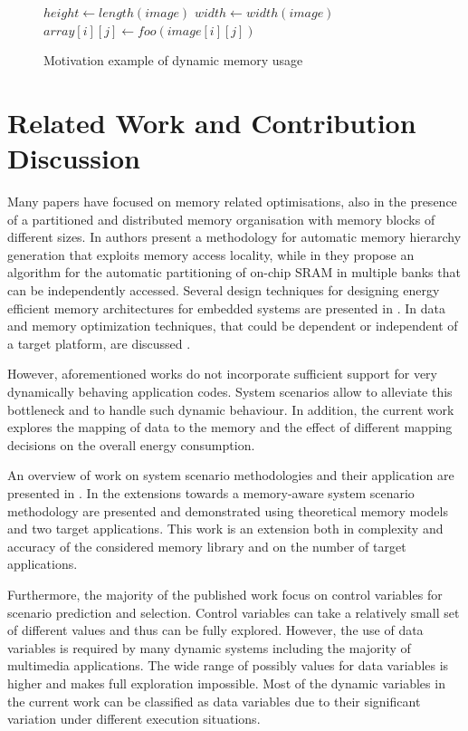 \documentclass[a4paper,conference]{IEEEtran}
\begin{document}
\begin{figure}[!t]
\begin{algorithmic}
	\STATE $height \gets length(image)$
	\STATE $width \gets width(image)$
			\STATE $array[i][j] \gets foo(image[i][j])$
		\ENDFOR
	\ENDFOR
\ENDWHILE
\end{algorithmic}
\caption{Motivation example of dynamic memory usage}
\label{fig:motivation}
\end{figure}

\section{Related Work and Contribution Discussion}
\label{sec:related}

Many papers have focused on memory related optimisations, also in the presence of a partitioned and distributed memory organisation with memory blocks of different sizes. In \cite{Ben00b} authors present a methodology for automatic memory hierarchy generation that exploits memory access locality, while in \cite{Ben00c} they propose an algorithm for the automatic partitioning of on-chip SRAM in multiple banks that can be independently accessed. Several design techniques for designing energy efficient memory architectures for embedded systems are presented in \cite{Mac02}. In \cite{Pgk01} data and memory optimization techniques, that could be dependent or independent of a target platform, are discussed . 

However, aforementioned works do not incorporate sufficient support for very dynamically behaving application codes. System scenarios allow to alleviate this bottleneck and to handle such dynamic behaviour. In addition, the current work explores the mapping of data to the memory and the effect of different mapping decisions on the overall energy consumption.

An overview of work on system scenario methodologies and their application are presented in \cite{Gheorghita2007}. In \cite{Fil12} the extensions towards a memory-aware system scenario methodology are presented and demonstrated using theoretical memory models and two target applications. This work is an extension both in complexity and accuracy of the considered memory library and on the number of target applications. 

Furthermore, the majority of the published work focus on control variables for scenario prediction and selection. Control variables can take a relatively small set of different values and thus can be fully explored. However, the use of data variables \cite{Elena2010} is required by many dynamic systems including the majority of multimedia applications. The wide range of possibly values for data variables is higher and makes full exploration impossible. Most of the dynamic variables in the current work can be classified as data variables due to their significant variation under different execution situations. 
\end{document}
